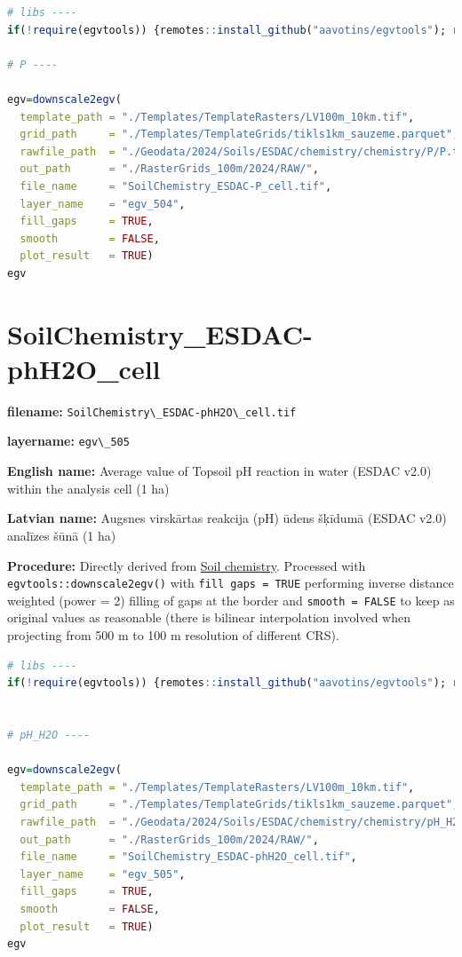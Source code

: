 \documentclass[
]{book}
\newcommand{\passthrough}[1]{#1}
\begin{document}
\begin{lstlisting}[language=R]
# libs ----
if(!require(egvtools)) {remotes::install_github("aavotins/egvtools"); require(egvtools)}

# P ----

egv=downscale2egv(
  template_path = "./Templates/TemplateRasters/LV100m_10km.tif",
  grid_path     = "./Templates/TemplateGrids/tikls1km_sauzeme.parquet",
  rawfile_path  = "./Geodata/2024/Soils/ESDAC/chemistry/chemistry/P/P.tif",
  out_path      = "./RasterGrids_100m/2024/RAW/",
  file_name     = "SoilChemistry_ESDAC-P_cell.tif",
  layer_name    = "egv_504",
  fill_gaps     = TRUE,
  smooth        = FALSE,
  plot_result   = TRUE)
egv
\end{lstlisting}

\section{SoilChemistry\_ESDAC-phH2O\_cell}\label{ch06.505}

\textbf{filename:} \passthrough{\lstinline!SoilChemistry\_ESDAC-phH2O\_cell.tif!}

\textbf{layername:} \passthrough{\lstinline!egv\_505!}

\textbf{English name:} Average value of Topsoil pH reaction in water (ESDAC v2.0) within the analysis cell (1 ha)

\textbf{Latvian name:} Augsnes virskārtas reakcija (pH) ūdens šķīdumā (ESDAC v2.0) analīzes šūnā (1 ha)

\textbf{Procedure:} Directly derived from \hyperref[Ch04.07.01]{Soil chemistry}. Processed
with \passthrough{\lstinline!egvtools::downscale2egv()!} with \passthrough{\lstinline!fill gaps = TRUE!} performing inverse
distance weighted (power = 2) filling of gaps at the border and \passthrough{\lstinline!smooth = FALSE!}
to keep as original values as reasonable (there is bilinear interpolation
involved when projecting from 500 m to 100 m resolution of different CRS).

\begin{lstlisting}[language=R]
# libs ----
if(!require(egvtools)) {remotes::install_github("aavotins/egvtools"); require(egvtools)}


# pH_H2O ----

egv=downscale2egv(
  template_path = "./Templates/TemplateRasters/LV100m_10km.tif",
  grid_path     = "./Templates/TemplateGrids/tikls1km_sauzeme.parquet",
  rawfile_path  = "./Geodata/2024/Soils/ESDAC/chemistry/chemistry/pH_H2O/pH_H2O.tif",
  out_path      = "./RasterGrids_100m/2024/RAW/",
  file_name     = "SoilChemistry_ESDAC-phH2O_cell.tif",
  layer_name    = "egv_505",
  fill_gaps     = TRUE,
  smooth        = FALSE,
  plot_result   = TRUE)
egv
\end{lstlisting}
\end{document}

